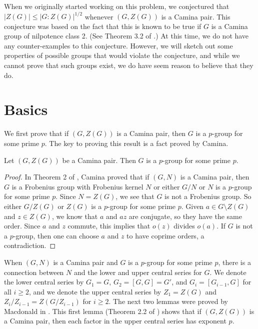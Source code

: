 When we originally started working on this problem, we conjectured that $|Z (G)| \le |G:Z (G)|^{1/2}$ whenever $(G,Z(G))$ is a Camina pair.  This conjecture was based on the fact that this is known to be true if $G$ is a Camina group of nilpotence class 2.  (See Theorem 3.2 of \cite{MacD1}.)  At this time, we do not have any counter-examples to this conjecture.  However, we will sketch out some properties of possible groups that would violate the conjecture, and while we cannot prove that such groups exist, we do have seem reason to believe that they do.

\section{Basics}

We first prove that if $(G,Z(G))$ is a Camina pair, then $G$ is a $p$-group for some prime $p$.  The key to proving this result is a fact proved by Camina.

\begin{lemma}
Let $(G,Z(G))$ be a Camina pair.  Then $G$ is a $p$-group for some prime $p$.
\end{lemma}

\begin{proof}
In Theorem 2 of \cite{Camina}, Camina proved that if $(G,N)$ is a Camina pair, then $G$ is a Frobenius group with Frobenius kernel $N$ or either $G/N$ or $N$ is a $p$-group for some prime $p$.  Since $N = Z(G)$, we see that $G$ is not a Frobenius group.  So either $G/Z(G)$ or $Z(G)$ is a $p$-group for some prime $p$.  Given $a \in G \setminus Z(G)$ and $z \in Z(G)$, we know that $a$ and $az$ are conjugate, so they have the same order.  Since $a$ and $z$ commute, this implies that $o(z)$ divides $o(a)$.  If $G$ is not a $p$-group, then one can choose $a$ and $z$ to have coprime orders, a contradiction.
\end{proof}

When $(G,N)$ is a Camina pair and $G$ is a $p$-group for some prime $p$, there is a connection between $N$ and the lower and upper central series for $G$.  We denote the lower central series by $G_1 = G$, $G_2 = [G,G] = G'$, and $G_i = [G_{i-1},G]$ for all $i \ge 2$, and we denote the upper central series by $Z_1 = Z(G)$ and $Z_i/Z_{i-1} = Z(G/Z_{i-1})$ for $i \ge 2$.  The next two lemmas were proved by Macdonald in \cite{MacD1}.  This first lemma (Theorem 2.2 of \cite{MacD1}) shows that if $(G,Z(G))$ is a Camina pair, then each factor in the upper central series has exponent $p$.

